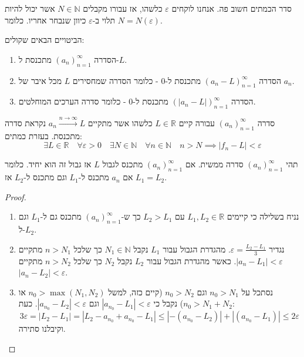 \documentclass{tstextbook}
\begin{document}
\begin{remark}
סדר הכמתים חשוב פה. אנחנו לוקחים \(\varepsilon\) כלשהו, אז עבורו מקבלים \(N\in \mathbb{N}\) אשר יכול להיות תלוי ב-\(\varepsilon\) כיוון שנבחר אחריו. כלומר \(N=N\left( \varepsilon \right)\).

\end{remark}
\begin{proposition}
הביטויים הבאים שקולים:

  \begin{enumerate}
    \item הסדרה \((a_n)_{n=1}^\infty\) מתכנסת ל-\(L\). 


    \item הסדרה \((a_n-L)_{n=1}^\infty\) מתכנסת ל-0 - כלומר הסדרה שמחסירים \(L\) מכל איבר של \(a_{n}\). 


    \item הסדרה \((|a_{n}-L|)_{n=1}^\infty\) מתכנסת ל-0 - כלומר סדרה הערכים המוחלטים. 


  \end{enumerate}
\end{proposition}
\begin{definition}
סדרה \((a_n)_{n=1}^\infty\) עבורה קיים \(L \in \mathbb{R}\) כלשהו אשר מתקיים \(a_{n}\xrightarrow{n\to \infty}L\) נקראת סדרה מתכנסת. בעזרת כמתים:
$$\exists L \in \mathbb{R}\quad \forall\varepsilon>0\quad \exists N \in \mathbb{N}\quad \forall n\in \mathbb{N}\quad n>N\implies |f_{n}-L|<\varepsilon$$

\end{definition}
\begin{proposition}
תהי \((a_n)_{n=1}^\infty\) סדרה ממשית. אם \((a_n)_{n=1}^\infty\) מתכנס לגבול \(L\) אז גבול זה הוא יחיד. כלומר אם \(a_{n}\) מתכנס ל-\(L_{1}\) וגם מתכנס ל-\(L_{2}\) אז \(L_{1}=L_{2}\).

\end{proposition}
\begin{proof}
  \begin{enumerate}
    \item נניח בשלילה כי קיימים \(L_{1},L_{2} \in \mathbb{R}\) עם \(L_{2}>L_{1}\) כך ש-\((a_n)_{n=1}^\infty\) מתכנס גם ל-\(L_{1}\) וגם ל-\(L_{2}\). 


    \item נגדיר \(\varepsilon= \frac{L_{2}-L_{1}}{3}\). מהגדרת הגבול עבור \(L_{1}\) נקבל \(N_{1} \in \mathbb{N}\) כך שלכל \(n>N_{1}\) מתקיים \(\lvert a_{n}-L_{1} \rvert<\varepsilon\). כאשר מהגדרת הגבול עבור \(L_{2}\) נקבל \(N_{2}\) כך שלכל \(n>N_{2}\) מתקיים \(|a_{n}-L_{2}|<\varepsilon\). 


    \item נסתכל על \(n_{0}>N_{1}\) וגם \(n_{0}>N_{2}\) (קיים כזה, למשל \(n_{0}>\max(N_{1},N_{2})\) או \(n_{0}>N_{1}+N_{2}\)) נקבל כי \(|a_{n_{0}}-L_{1}|<\varepsilon\) וגם \(|a_{n_{0}}-L_{2}|<\varepsilon\). כעת: 
$$3\varepsilon=\lvert L_{2}-L_{1} \rvert =|L_{2}-a_{n_{0}}+a_{n_{0}}-L_{1}|\leq |-(a_{n_{0}}-L_{2})|+|(a_{n_{0}}-L_{1})|\leq 2\varepsilon$$
וקיבלנו סתירה.


  \end{enumerate}
\end{proof}
\end{document}
